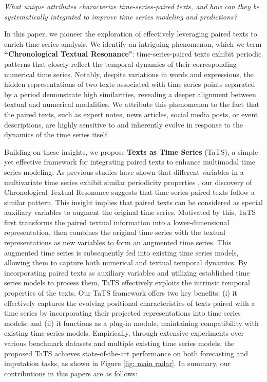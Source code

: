 \textit{What unique attributes characterize time-series-paired texts, and how can they be systematically integrated to improve time series modeling and predictions?}

In this paper, we pioneer the exploration of effectively leveraging paired texts to enrich time series analysis. 
We identify an intriguing phenomenon, which we term \textbf{``Chronological Textual Resonance"}: time-series-paired texts exhibit periodic patterns that closely reflect the temporal dynamics of their corresponding numerical time series. Notably, despite variations in words and expressions, the hidden representations of two texts associated with time series points separated by a period demonstrate high similarities, revealing a deeper alignment between textual and numerical modalities. We attribute this phenomenon to the fact that the paired texts, such as expert notes, news articles, social media posts, or event descriptions, are highly sensitive to and inherently evolve in response to the dynamics of the time series itself.

Building on these insights, we propose \textbf{Texts as Time Series} (TaTS), a simple yet effective framework for integrating paired texts to enhance multimodal time series modeling. 
As previous studies have shown that different variables in a multivariate time series exhibit similar periodicity properties \cite{crossformer, wang2024timexer, yi2024frequency}, our discovery of Chronological Textual Resonance suggests that time-series-paired texts follow a similar pattern. This insight implies that paired texts can be considered as special auxiliary variables to augment the original time series. Motivated by this, TaTS first transforms the paired textual information into a lower-dimensional representation, then combines the original time series with the textual representations as new variables to form an augmented time series. This augmented time series is subsequently fed into existing time series models, allowing them to capture both numerical and textual temporal dynamics. 
By incorporating paired texts as auxiliary variables and utilizing established time series models to process them, TaTS effectively exploits the intrinsic temporal properties of the texts. 
Our TaTS framework offers two key benefits: (i) it effectively captures the evolving positional characteristics of texts paired with a time series by incorporating their projected representations into time series models; and (ii) it functions as a plug-in module, maintaining compatibility with existing time series models. Empirically, through extensive experiments over various benchmark datasets and multiple existing time series models, the proposed TaTS achieves state-of-the-art performance on both forecasting and imputation tasks, as shown in Figure \ref{fig: main radar}. In summary, our contributions in this papers are as follows:


